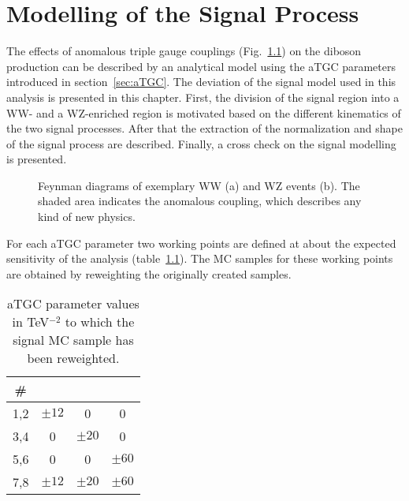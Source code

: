 \chapter{Modelling of the Signal Process}
\label{chap:signal}
The effects of anomalous triple gauge couplings (Fig.~\ref{fig:signal:fy_atgc}) on the diboson production can be described by an analytical model using the aTGC parameters introduced in section~\ref{sec:aTGC}. The deviation of the signal model used in this analysis is presented in this chapter. First, the division of the signal region into a WW- and a WZ-enriched region is motivated based on the different kinematics of the two signal processes. After that the extraction of the normalization and shape of the signal process are described. Finally, a cross check on the signal modelling is presented.
\begin{figure}
	\centering
	\caption[Feynman diagrams of two exemplary signal events]{Feynman diagrams of exemplary WW (a) and WZ events (b). The shaded area indicates the anomalous coupling, which describes any kind of new physics.}
	\label{fig:signal:fy_atgc}
\end{figure}

For each aTGC parameter two working points are defined at about the expected sensitivity of the analysis (table~\ref{tab:signal:aTGCpoints}). The MC samples for these working points are obtained by reweighting the originally created samples.
\begin{table}
	\centering
	\caption[aTGC working points]{aTGC parameter values in TeV$^{-2}$ to which the signal MC sample has been reweighted.}
	\label{tab:signal:aTGCpoints}
	\begin{tabular}{cccc}
	\hline
	\# & \Tcwww & \Tccw & \Tcb \\
	\hline
	1,2 &  $\pm 12$ & 0 & 0\\
	3,4 & 0 &  $\pm 20$ & 0\\
	5,6 & 0 & 0 &  $\pm 60$\\
	7,8 &	$\pm 12$ & $\pm 20$ & $\pm 60$\\
	\hline
	\end{tabular}
\end{table}


